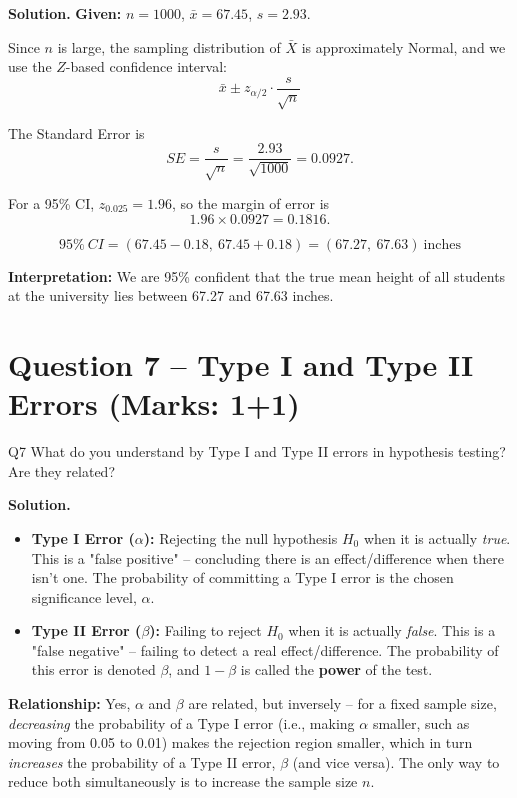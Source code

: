 \documentclass[11pt]{article}
\newcommand{\soln}{\par\noindent\textcolor{acolor}{\textbf{Solution.}}\quad}
\begin{document}
\soln
\textbf{Given:} $n=1000$, $\bar{x} = 67.45$, $s = 2.93$.

Since $n$ is large, the sampling distribution of $\bar{X}$ is approximately Normal, and we use the $Z$-based confidence interval:
\[
\bar{x} \pm z_{\alpha/2}\cdot \frac{s}{\sqrt{n}}
\]

The Standard Error is
\[
SE = \frac{s}{\sqrt{n}} = \frac{2.93}{\sqrt{1000}} = 0.0927.
\]

For a 95\% CI, $z_{0.025} = 1.96$, so the margin of error is
\[
1.96 \times 0.0927 = 0.1816.
\]

\[
\boxed{95\%\ CI = (67.45 - 0.18,\ 67.45+0.18) = (67.27,\ 67.63)\ \text{inches}}
\]

\textbf{Interpretation:} We are 95\% confident that the true mean height of all students at the university lies between 67.27 and 67.63 inches.

\section{Question 7 -- Type I and Type II Errors (Marks: 1+1)}
\begin{question}{Q7}
What do you understand by Type I and Type II errors in hypothesis testing? Are they related?
\end{question}

\soln
\begin{itemize}
\item \textbf{Type I Error ($\alpha$):} Rejecting the null hypothesis $H_0$ when it is actually \emph{true}. This is a "false positive" -- concluding there is an effect/difference when there isn't one. The probability of committing a Type I error is the chosen significance level, $\alpha$.

\item \textbf{Type II Error ($\beta$):} Failing to reject $H_0$ when it is actually \emph{false}. This is a "false negative" -- failing to detect a real effect/difference. The probability of this error is denoted $\beta$, and $1-\beta$ is called the \textbf{power} of the test.
\end{itemize}

\textbf{Relationship:} Yes, $\alpha$ and $\beta$ are related, but inversely -- for a fixed sample size, \emph{decreasing} the probability of a Type I error (i.e., making $\alpha$ smaller, such as moving from 0.05 to 0.01) makes the rejection region smaller, which in turn \emph{increases} the probability of a Type II error, $\beta$ (and vice versa). The only way to reduce both simultaneously is to increase the sample size $n$.
\end{document}
